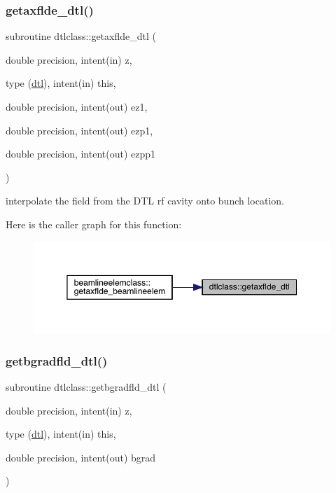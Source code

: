 \mbox{\label{namespacedtlclass_a1fb756446dfd217cc32e4a9088e7f4c7}} 
\subsubsection{\texorpdfstring{getaxflde\_dtl()}{getaxflde\_dtl()}}
{\footnotesize\ttfamily subroutine dtlclass\+::getaxflde\+\_\+dtl (\begin{DoxyParamCaption}\item[{double precision, intent(in)}]{z,  }\item[{type (\mbox{\hyperlink{namespacedtlclass_structdtlclass_1_1dtl}{dtl}}), intent(in)}]{this,  }\item[{double precision, intent(out)}]{ez1,  }\item[{double precision, intent(out)}]{ezp1,  }\item[{double precision, intent(out)}]{ezpp1 }\end{DoxyParamCaption})}



interpolate the field from the D\+TL rf cavity onto bunch location. 

Here is the caller graph for this function\+:\nopagebreak
\begin{figure}[H]
\begin{center}
\leavevmode
\includegraphics[width=350pt]{namespacedtlclass_a1fb756446dfd217cc32e4a9088e7f4c7_icgraph}
\end{center}
\end{figure}
\mbox{\label{namespacedtlclass_a79f0618eb609338c97470f6f8f05a848}} 
\subsubsection{\texorpdfstring{getbgradfld\_dtl()}{getbgradfld\_dtl()}}
{\footnotesize\ttfamily subroutine dtlclass\+::getbgradfld\+\_\+dtl (\begin{DoxyParamCaption}\item[{double precision, intent(in)}]{z,  }\item[{type (\mbox{\hyperlink{namespacedtlclass_structdtlclass_1_1dtl}{dtl}}), intent(in)}]{this,  }\item[{double precision, intent(out)}]{bgrad }\end{DoxyParamCaption})}

